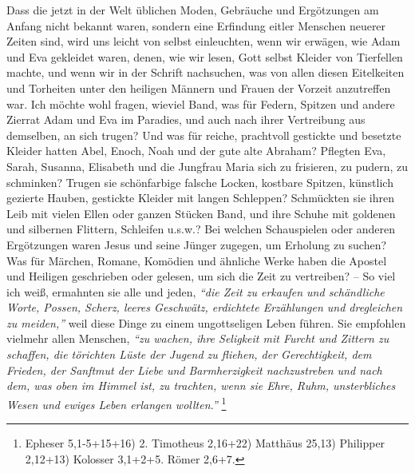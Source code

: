 Dass die jetzt in der Welt üblichen Moden, Gebräuche und Ergötzungen am Anfang
nicht bekannt waren, sondern eine Erfindung eitler Menschen neuerer Zeiten sind,
wird uns leicht von selbst einleuchten, wenn wir erwägen, wie
Adam und Eva
gekleidet waren, denen, wie wir lesen, Gott selbst Kleider von Tierfellen
machte, und wenn wir in der Schrift nachsuchen, was von allen diesen Eitelkeiten
und Torheiten unter den heiligen Männern und
Frauen der Vorzeit anzutreffen
war. Ich möchte wohl fragen, wieviel Band, was für Federn, Spitzen und andere
Zierrat Adam und Eva im Paradies, und auch nach ihrer Vertreibung aus
demselben, an sich trugen? Und was für reiche, prachtvoll gestickte und besetzte
Kleider hatten Abel, Enoch,
Noah und der gute alte Abraham?
Pflegten Eva, Sarah,
Susanna, Elisabeth und die
Jungfrau Maria sich zu frisieren, zu pudern, zu
schminken? Trugen sie schönfarbige falsche Locken, kostbare Spitzen, künstlich
gezierte Hauben, gestickte Kleider mit langen
Schleppen? Schmückten sie ihren
Leib mit vielen Ellen oder ganzen Stücken Band, und ihre Schuhe mit goldenen und
silbernen Flittern, Schleifen u.s.w.? Bei welchen Schauspielen oder anderen
Ergötzungen waren Jesus und seine Jünger zugegen, um Erholung zu suchen? Was für
Märchen, Romane, Komödien und
ähnliche Werke haben die Apostel und Heiligen
geschrieben oder gelesen, um sich die Zeit zu vertreiben? -- So viel ich weiß,
ermahnten sie alle und jeden,
\textit{"`die Zeit zu erkaufen und schändliche Worte,
Possen, Scherz, leeres Geschwätz, erdichtete Erzählungen und dregleichen zu meiden,"'}
weil diese Dinge zu einem ungottseligen Leben führen. Sie empfohlen vielmehr
allen Menschen,
\textit{"`zu wachen, ihre Seligkeit mit Furcht und Zittern zu schaffen,
die törichten Lüste der Jugend zu fliehen, der Gerechtigkeit, dem Frieden, der
Sanftmut der Liebe und Barmherzigkeit nachzustreben und nach dem, was oben
im Himmel ist, zu trachten, wenn sie Ehre, Ruhm, unsterbliches Wesen und ewiges
Leben erlangen wollten."'}
\footnote{Epheser 5,1-5+15+16)
2. Timotheus 2,16+22)
Matthäus 25,13)
Philipper 2,12+13)
Kolosser 3,1+2+5.
Römer 2,6+7.}

